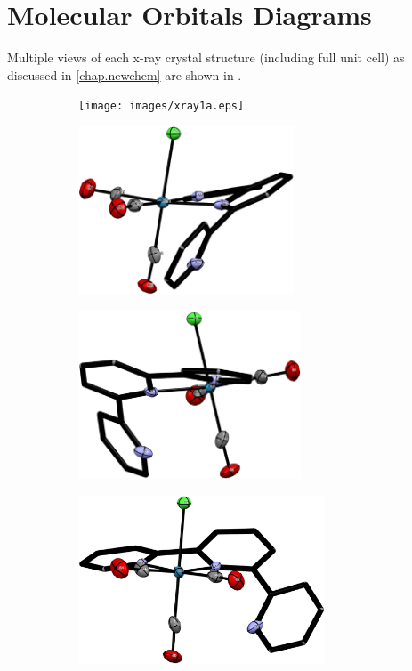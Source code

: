 \chapter{Molecular Orbitals Diagrams} \label{app.xrays}

Multiple views of each x-ray crystal structure (including full unit cell) as discussed in \autoref{chap.newchem} are shown in . 

\begin{figure}[!ht]
 \centering
 \begin{subfigure}[b]{0.49\textwidth}
  \texttt{[image: images/xray1a.eps]}
 \end{subfigure}
 \begin{subfigure}[b]{0.49\textwidth}
  \includegraphics[clip=true, width=\textwidth, height=50mm, keepaspectratio]{images/xray1b.eps}
 \end{subfigure}
 \begin{subfigure}[b]{0.49\textwidth}
  \includegraphics[clip=true, width=\textwidth, height=50mm, keepaspectratio]{images/xray1c.eps}
 \end{subfigure}
  \begin{subfigure}[b]{0.49\textwidth}
  \includegraphics[clip=true, width=\textwidth, height=50mm, keepaspectratio]{images/xray1d.eps}

\end{subfigure}
\end{figure}
